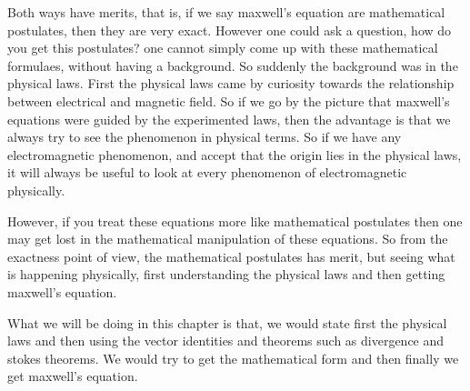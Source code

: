 Both ways have merits, that is, if we say maxwell's equation are mathematical postulates, then they are very exact. However one could ask a question, how do you get this postulates? one cannot simply come up with these mathematical formulaes, without having a background. So suddenly the background was in the physical laws. First the physical laws came by curiosity towards the relationship between electrical and magnetic field. So if we go by the picture that maxwell's equations were guided by the experimented laws, then the advantage is that we always try to see the phenomenon in physical terms. So if we have any electromagnetic phenomenon, and accept that the origin lies in the physical laws, it will always be useful to look at every phenomenon of electromagnetic physically.

However, if you treat these equations more like mathematical postulates then one may get lost in the mathematical manipulation of these equations. So from the exactness point of view, the mathematical postulates has merit, but seeing what is happening physically, first understanding the physical laws and then getting maxwell's equation.

What we will be doing in this chapter is that, we would state first the physical laws and then using the vector identities and theorems such as divergence and stokes theorems. We would try to get the mathematical form and then finally we get maxwell's equation.

